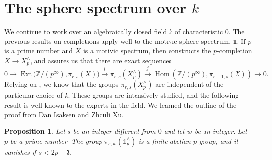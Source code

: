 \documentclass[11pt, oneside, dvipsnames, svgnames, table, final]{amsart}
\newcommand{\mathbx}[1]{\mathbb{#1}}
\theoremstyle{plain}
\newtheorem{proposition}[thm]{Proposition}
\theoremstyle{definition}
\theoremstyle{remark}
\newcommand{\Z}{\mathbx{Z}}
\newcommand{\Ext}{\operatorname{Ext}}
\newcommand{\Hom}{\operatorname{Hom}}
\newcommand{\<}[1]{{\langle}#1 {\rangle}}
\newcommand{\one}{\mathbb{1}}
\newcommand{\Zpinf}{\Z/\left(p^\infty\right)}
\begin{document}
\section{The sphere spectrum over \texorpdfstring{$k$}{k}}
\label{sec:sphere-spectrum-over}

We continue to work over an algebraically closed field $k$ of characteristic $0$. The previous results on completions apply well to the motivic sphere spectrum, $\one$. If $p$ is a prime number and $X$ is a motivic spectrum, then \cite[\S3]{Rondigs2008a} constructs the $p$-completion $X \to X^\wedge_p$, and assures us that there are exact sequences
\begin{equation}
  \label{eq:2}
  0 \to \Ext\Big(\Zpinf, \pi_{r,s}(X)\Big) \overset{i}\to \pi_{r,s}(X^\wedge_p) \overset{j}\to \Hom(\Zpinf, \pi_{r-1,s}(X)) \to 0.
\end{equation}
 Relying on \cite{Rondigs2008a}, we know that the groups $\pi_{r,s}(X^\wedge_p)$ are independent of the particular choice of $k$. These groups are intensively studied, and the following result is well known to the experts in the field. We learned the outline of the proof from Dan Isaksen and Zhouli Xu.
\begin{proposition} \label{pr:AdamsConvergeFinite}
  Let $s$ be an integer different from $0$ and let $w$ be an integer. Let $p$ be a prime number. The group $\pi_{s,w}(\one^{\wedge}_p)$ is a finite abelian $p$-group, and it vanishes if $s< 2p-3$.
\end{proposition}
\end{document}
